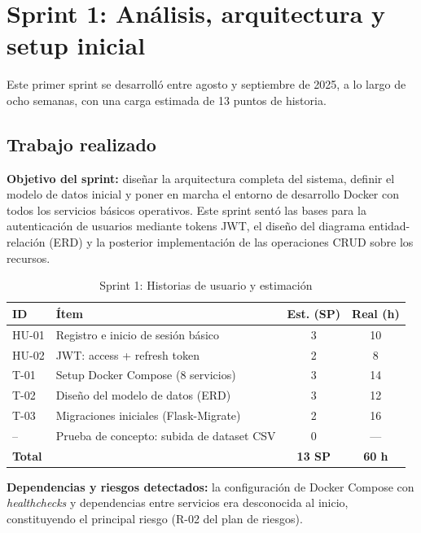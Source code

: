 \section{Sprint 1: Análisis, arquitectura y setup inicial}
\label{sec:sprint1}
Este primer sprint se desarrolló entre agosto y septiembre de 2025, a lo largo
de ocho semanas, con una carga estimada de 13 puntos de historia.

\subsection{Trabajo realizado}

\textbf{Objetivo del sprint:} diseñar la arquitectura completa del sistema,
definir el modelo de datos inicial y poner en marcha el entorno de desarrollo
Docker con todos los servicios básicos operativos. Este sprint sentó las bases
para la autenticación de usuarios mediante tokens \ac{JWT}, el diseño del
diagrama entidad-relación (\ac{ERD}) y la posterior implementación de las
operaciones \ac{CRUD} sobre los recursos.

\begin{table}[htbp]
  \centering
  \small
  \caption{Sprint 1: Historias de usuario y estimación}
  \label{tab:sprint1-hu}
  \begin{tabularx}{\textwidth}{l X c c}
    \toprule
    \textbf{ID} & \textbf{Ítem} & \textbf{Est. (SP)} & \textbf{Real (h)} \\
    \midrule
    HU-01 & Registro e inicio de sesión básico & 3 & 10 \\
    HU-02 & JWT: access + refresh token & 2 & 8 \\
    T-01  & Setup Docker Compose (8 servicios) & 3 & 14 \\
    T-02  & Diseño del modelo de datos (\ac{ERD}) & 3 & 12 \\
    T-03  & Migraciones iniciales (Flask-Migrate) & 2 & 16 \\
    --    & Prueba de concepto: subida de dataset \ac{CSV} & 0 & --- \\
    \midrule
    \multicolumn{2}{l}{\textbf{Total}} & \textbf{13 SP} & \textbf{60 h} \\
    \bottomrule
  \end{tabularx}
\end{table}

\textbf{Dependencias y riesgos detectados:} la configuración de Docker Compose
con \emph{healthchecks} y dependencias entre servicios era desconocida al
inicio, constituyendo el principal riesgo (R-02 del plan de riesgos).

